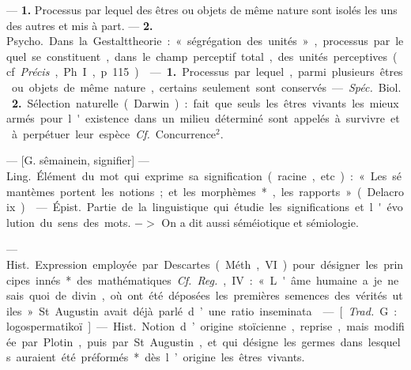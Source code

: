 \begin{itemize}[leftmargin=1cm, label=, itemsep=1pt]
 — {\bf 1.} Processus par lequel
des êtres ou objets de même nature
sont isolés les uns des autres et mis
à part. — {\bf 2.} \si{Psycho.} Dans la Gestalttheorie : « ségrégation des unités »,
processus par lequel se constituent,
dans le champ perceptif total,
des unités perceptives (cf. {\it Précis},
Ph. I, p. 115).

 — {\bf 1.} Processus par lequel,
parmi plusieurs êtres ou objets de
même nature, certains seulement
sont conservés.

— {\it Spéc.} \si{Biol.} {\bf 2.} Sélection naturelle (Darwin) : fait que seuls les
êtres vivants les mieux armés pour
l'existence dans un milieu déterminé sont appelés à survivre et à perpétuer leur espèce. {\it Cf.} Concurrence$^2$.

 — [G. sêmainein, signifier] —
\si{Ling.} Élément du mot qui exprime
sa signification (racine, etc.) : « Les
sémantèmes portent les notions; et
les morphèmes*, les rapports »
(Delacroix).

 — \si{Épist.} Partie de la
linguistique qui étudie les significations et l'évolution du sens des mots.
$->$ On a dit aussi séméiotique et
sémiologie.

 — \si{Hist.} Expression employée par Descartes (Méth.,
VI) pour désigner les principes
innés* des mathématiques. {\it Cf.} {\it Reg.},
IV : « L'âme humaine a je ne sais
quoi de divin, où ont été déposées
les premières semences des vérités
utiles. » St. Augustin avait déjà
parlé d’une ratio inseminata.

 — [{\it Trad.} G. : logospermatikoï] — \si{Hist.} Notion d’origine stoïcienne, reprise, mais modifiée par Plotin, puis par St Augustin, et qui désigne les germes dans
lesquels auraient été préformés* dès
l’origine les êtres vivants.


\end{itemize}
